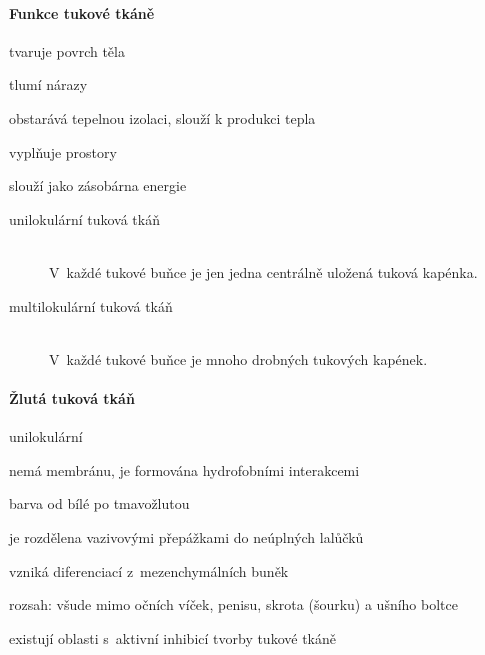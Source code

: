\documentclass[DIV=8]{scrreprt}
\begin{document}
\paragraph{Funkce tukové tkáně}
\begin{myItemize}[nosep]
    \item tvaruje povrch těla
    \item tlumí nárazy
    \item obstarává tepelnou izolaci, slouží k produkci tepla
    \item vyplňuje prostory
    \item slouží jako zásobárna energie
\end{myItemize}



\begin{description}
\item[unilokulární tuková tkáň]\hfill \\
V každé tukové buňce je jen jedna centrálně uložená tuková kapénka.


\item[multilokulární tuková tkáň]\hfill \\
V každé tukové buňce je mnoho drobných tukových kapének.

\end{description}


\paragraph{Žlutá tuková tkáň}
\begin{myItemize}[nosep]
    \item unilokulární
    \item nemá membránu, je formována hydrofobními interakcemi
    \item barva od bílé po tmavožlutou
    \item je rozdělena vazivovými přepážkami do neúplných lalůčků
    \item vzniká diferenciací z mezenchymálních buněk
    \item rozsah: všude mimo očních víček, penisu, skrota (šourku) a ušního boltce
\begin{myItemize}[nosep]
    \item existují oblasti s aktivní inhibicí tvorby tukové tkáně
\end{myItemize}

\end{myItemize}
\end{document}
